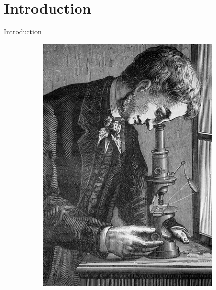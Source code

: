 \documentclass{beamer}
\begin{document}
\section{Introduction}
\begin{frame}{Introduction}
	\hfill
	\begin{figure}
		\begin{subfigure}{0.27\textwidth}
			\centering
			\includegraphics[width=\textwidth]{images/old_microscope.jpg}
		\end{subfigure}
		\begin{subfigure}{0.27\textwidth}
			\centering

\end{subfigure}
\end{figure}
\end{frame}
\end{document}
